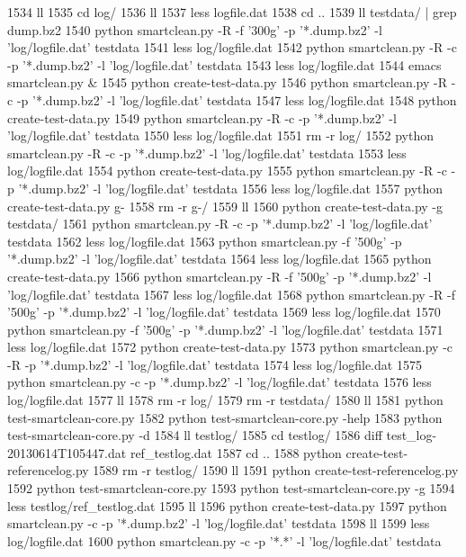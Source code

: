  1534  ll
 1535  cd log/
 1536  ll
 1537  less logfile.dat 
 1538  cd ..
 1539  ll testdata/ | grep dump.bz2
 1540  python smartclean.py -R -f '300g' -p '*.dump.bz2' -l 'log/logfile.dat' testdata
 1541  less log/logfile.dat 
 1542  python smartclean.py -R -c -p '*.dump.bz2' -l 'log/logfile.dat' testdata
 1543  less log/logfile.dat 
 1544  emacs smartclean.py &
 1545  python create-test-data.py 
 1546  python smartclean.py -R -c -p '*.dump.bz2' -l 'log/logfile.dat' testdata
 1547  less log/logfile.dat 
 1548  python create-test-data.py 
 1549  python smartclean.py -R -c -p '*.dump.bz2' -l 'log/logfile.dat' testdata
 1550  less log/logfile.dat 
 1551  rm -r log/
 1552  python smartclean.py -R -c -p '*.dump.bz2' -l 'log/logfile.dat' testdata
 1553  less log/logfile.dat 
 1554  python create-test-data.py 
 1555  python smartclean.py -R -c -p '*.dump.bz2' -l 'log/logfile.dat' testdata
 1556  less log/logfile.dat 
 1557  python create-test-data.py g-
 1558  rm -r g-/
 1559  ll
 1560  python create-test-data.py -g testdata/
 1561  python smartclean.py -R -c -p '*.dump.bz2' -l 'log/logfile.dat' testdata
 1562  less log/logfile.dat 
 1563  python smartclean.py -f '500g' -p '*.dump.bz2' -l 'log/logfile.dat' testdata
 1564  less log/logfile.dat 
 1565  python create-test-data.py
 1566  python smartclean.py -R -f '500g' -p '*.dump.bz2' -l 'log/logfile.dat' testdata
 1567  less log/logfile.dat 
 1568  python smartclean.py -R -f '500g' -p '*.dump.bz2' -l 'log/logfile.dat' testdata
 1569  less log/logfile.dat 
 1570  python smartclean.py -f '500g' -p '*.dump.bz2' -l 'log/logfile.dat' testdata
 1571  less log/logfile.dat 
 1572  python create-test-data.py
 1573  python smartclean.py -c -R -p '*.dump.bz2' -l 'log/logfile.dat' testdata
 1574  less log/logfile.dat 
 1575  python smartclean.py -c -p '*.dump.bz2' -l 'log/logfile.dat' testdata
 1576  less log/logfile.dat 
 1577  ll
 1578  rm -r log/
 1579  rm -r testdata/
 1580  ll
 1581  python test-smartclean-core.py 
 1582  python test-smartclean-core.py -help
 1583  python test-smartclean-core.py -d
 1584  ll testlog/
 1585  cd testlog/
 1586  diff test_log-20130614T105447.dat ref_testlog.dat 
 1587  cd ..
 1588  python create-test-referencelog.py 
 1589  rm -r testlog/
 1590  ll
 1591  python create-test-referencelog.py 
 1592  python test-smartclean-core.py
 1593  python test-smartclean-core.py -g
 1594  less testlog/ref_testlog.dat 
 1595  ll
 1596  python create-test-data.py 
 1597  python smartclean.py -c -p '*.dump.bz2' -l 'log/logfile.dat' testdata
 1598  ll
 1599  less log/logfile.dat 
 1600  python smartclean.py -c -p '*.*' -l 'log/logfile.dat' testdata
